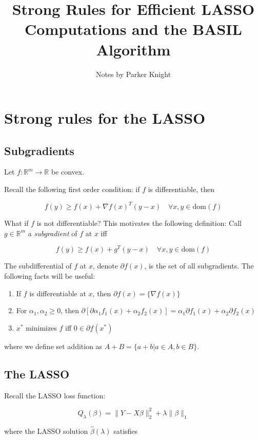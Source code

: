 \documentclass{amsart}
\title{Strong Rules for Efficient LASSO Computations and the BASIL Algorithm}
\author{Notes by Parker Knight}
\newcommand{\R}{\mathbb{R}}
\newcommand{\dom}{\textrm{dom}}
\begin{document}
\maketitle

\section{Strong rules for the LASSO}

\subsection{Subgradients}

Let $f: \R^m \rightarrow \R$ be convex.

\bigskip

Recall the following first order condition: if $f$ is differentiable, then 

$$f(y) \geq f(x) + \nabla f(x)^T(y - x) \quad \forall x, y \in \dom(f)$$

What if $f$ is not differentiable? This motivates the following definition: Call
$g \in \R^m$ a \textit{subgradient} of $f$ at $x$ iff

$$f(y) \geq f(x) + g^T(y - x) \quad \forall x, y \in \dom(f)$$

The subdifferential of $f$ at $x$, denote $\partial f(x)$, is the set of all
subgradients. The following facts will be useful:

\begin{enumerate}
	\item If $f$ is differentiable at $x$, then $\partial f(x) = \{\nabla f(x) \}$
	\item For $\alpha_1, \alpha_2 \geq 0$, then $\partial \left[\partial
	\alpha_1 f_1(x) + \alpha_2 f_2(x) \right] = \alpha_1 \partial f_1(x) +
	\alpha_2 \partial f_2(x)$
	\item $x^*$ minimizes $f$ iff $0 \in \partial f(x^*)$
\end{enumerate}

where we define set addition as $A + B = \{a + b | a \in A, b \in B \}$. 
\subsection{The LASSO}

Recall the LASSO loss function:

$$Q_{\lambda}(\beta) = \|Y - X\beta \|_2^2 + \lambda \|\beta \|_1$$

where the LASSO solution $\hat{\beta}(\lambda)$ satisfies
\end{document}
